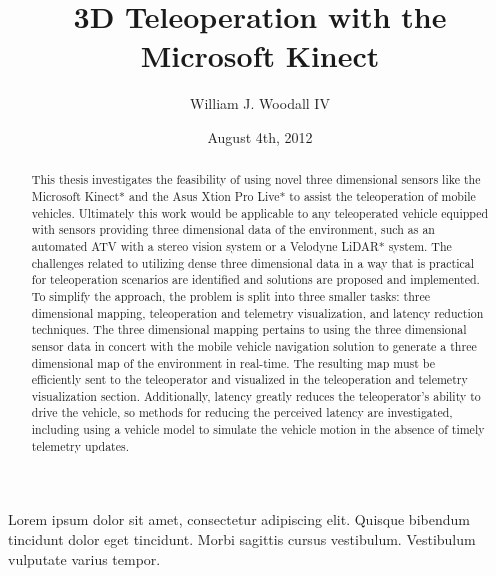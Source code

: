 \documentclass[12pt]{report}
\title{3D Teleoperation with the Microsoft Kinect}
\author{William J. Woodall IV}
\date{August 4th, 2012} %
\begin{document}

\begin{romanpages}      %

\TitlePage 


\begin{abstract} 
This thesis investigates the feasibility of using novel three dimensional sensors like the Microsoft Kinect* and the Asus Xtion Pro Live* to assist the teleoperation of mobile vehicles.  Ultimately this work would be applicable to any teleoperated vehicle equipped with sensors providing three dimensional data of the environment, such as an automated ATV with a stereo vision system or a Velodyne LiDAR* system.  The challenges related to utilizing dense three dimensional data in a way that is practical for teleoperation scenarios are identified and solutions are proposed and implemented.  To simplify the approach, the problem is split into three smaller tasks: three dimensional mapping, teleoperation and telemetry visualization, and latency reduction techniques.  The three dimensional mapping pertains to using the three dimensional sensor data in concert with the mobile vehicle navigation solution to generate a three dimensional map of the environment in real-time.  The resulting map must be efficiently sent to the teleoperator and visualized in the teleoperation and telemetry visualization section.  Additionally, latency greatly reduces the teleoperator's ability to drive the vehicle, so methods for reducing the perceived latency are investigated, including using a vehicle model to simulate the vehicle motion in the absence of timely telemetry updates.
\end{abstract}


\begin{acknowledgments}
Lorem ipsum dolor sit amet, consectetur adipiscing elit. Quisque bibendum tincidunt dolor eget tincidunt. Morbi sagittis cursus vestibulum. Vestibulum vulputate varius tempor.
\end{acknowledgments}

\tableofcontents
\listoffigures
\listoftables

\printnomenclature[0.5in] %
\end{romanpages}        %
\end{document}
